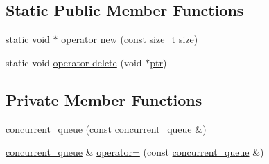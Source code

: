\subsection*{Static Public Member Functions}
\begin{DoxyCompactItemize}
\item 
static void $\ast$ \hyperlink{classconcurrent__queue_ac9b6d3dc847aacc7460f17505c6fb9bd}{operator new} (const size\-\_\-t size)
\item 
static void \hyperlink{classconcurrent__queue_a9e7f6867e078909c37d00439c3a20214}{operator delete} (void $\ast$\hyperlink{counted__ptr_8hpp_ac0fd97c9323e3a3981515b00166f14d8}{ptr})
\end{DoxyCompactItemize}
\subsection*{Private Member Functions}
\begin{DoxyCompactItemize}
\item 
\hyperlink{classconcurrent__queue_a35812a51f3fdf946b81b1692b211b920}{concurrent\-\_\-queue} (const \hyperlink{classconcurrent__queue}{concurrent\-\_\-queue} \&)
\item 
\hyperlink{classconcurrent__queue}{concurrent\-\_\-queue} \& \hyperlink{classconcurrent__queue_a2f9c408b25336e29e14bb22bee41f4a9}{operator=} (const \hyperlink{classconcurrent__queue}{concurrent\-\_\-queue} \&)
\end{DoxyCompactItemize}


